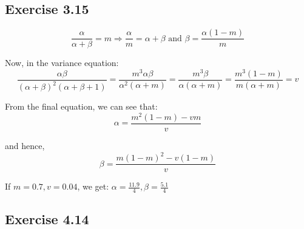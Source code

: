 \documentclass{article}
\begin{document}
\subsection*{Exercise 3.15}
\begin{flushleft}
\[\frac{\alpha}{\alpha + \beta} = m \Rightarrow \frac{\alpha}{m} = \alpha + \beta \text{ and } \beta = \frac{\alpha(1 - m)}{m}\]

Now, in the variance equation:
\begin{equation}
\frac{\alpha \beta}{(\alpha + \beta)^{2} (\alpha + \beta + 1)} = \frac{m^3 \alpha \beta}{\alpha^{2} (\alpha + m)} = \frac{m^3 \beta}{\alpha (\alpha + m)} = \frac{m^3 (1 - m)}{m(\alpha + m)} = v
\end{equation}

From the final equation, we can see that:
\begin{equation}
\alpha = \frac{m^{2}(1 - m) - vm}{v}
\end{equation}

and hence,
\begin{equation}
\beta = \frac{m(1 - m)^{2} - v(1 - m)}{v}
\end{equation}

If \(m = 0.7, v = 0.04\), we get: \(\alpha = \frac{11.9}{4}, \beta = \frac{5.1}{4}\)
\end{flushleft}

\subsection*{Exercise 4.14}
\end{document}

